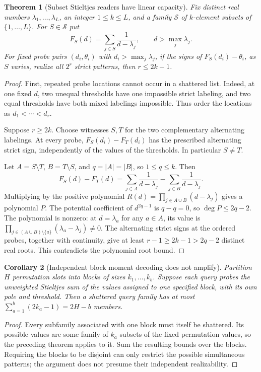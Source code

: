 \documentclass[11pt]{article}
\newtheorem{theorem}{Theorem}
\newtheorem{corollary}[theorem]{Corollary}
\begin{document}
\begin{theorem}[Subset Stieltjes readers have linear capacity]
Fix distinct real numbers $\lambda_1,\ldots,\lambda_L$, an integer
$1\le k\le L$, and a family $\mathcal S$ of $k$-element subsets of
$\{1,\ldots,L\}$. For $S\in\mathcal S$ put
\[
 F_S(d)=\sum_{j\in S}\frac1{d-\lambda_j},
 \qquad d>\max_j\lambda_j.
\]
For fixed probe pairs $(d_i,\theta_i)$ with $d_i>\max_j\lambda_j$,
if the signs of $F_S(d_i)-\theta_i$, as $S$ varies, realize all
$2^r$ strict patterns, then $r\le2k-1$.
\end{theorem}

\begin{proof}
First, repeated probe locations cannot occur in a shattered list.
Indeed, at one fixed $d$, two unequal thresholds have one impossible
strict labeling, and two equal thresholds have both mixed labelings
impossible. Thus order the locations as $d_1<\cdots<d_r$.

Suppose $r\ge2k$. Choose witnesses $S,T$ for the two complementary
alternating labelings. At every probe, $F_S(d_i)-F_T(d_i)$ has the
prescribed alternating strict sign, independently of the values of
the thresholds. In particular $S\ne T$.

Let $A=S\setminus T$, $B=T\setminus S$, and $q=|A|=|B|$, so
$1\le q\le k$. Then
\[
 F_S(d)-F_T(d)=\sum_{j\in A}\frac1{d-\lambda_j}
                 -\sum_{j\in B}\frac1{d-\lambda_j}.
\]
Multiplying by the positive polynomial
$R(d)=\prod_{j\in A\cup B}(d-\lambda_j)$ gives a polynomial $P$.
The potential coefficient of $d^{2q-1}$ is $q-q=0$, so
$\deg P\le2q-2$. The polynomial is nonzero: at $d=\lambda_a$ for
any $a\in A$, its value is
$\prod_{j\in(A\cup B)\setminus\{a\}}(\lambda_a-\lambda_j)\ne0$.
The alternating strict signs at the ordered probes, together with
continuity, give at least $r-1\ge2k-1>2q-2$ distinct real roots.
This contradicts the polynomial root bound.
\end{proof}

\begin{corollary}[Independent block moment decoding does not amplify]
Partition $H$ permutation slots into blocks of sizes $k_1,\ldots,k_b$.
Suppose each query probes the unweighted Stieltjes sum of the values
assigned to one specified block, with its own pole and threshold.
Then a shattered query family has at most
$\sum_{a=1}^b(2k_a-1)=2H-b$ members.
\end{corollary}

\begin{proof}
Every subfamily associated with one block must itself be shattered.
Its possible values are some family of $k_a$-subsets of the fixed
permutation values, so the preceding theorem applies to it. Sum the
resulting bounds over the blocks. Requiring the blocks to be disjoint
can only restrict the possible simultaneous patterns; the argument
does not presume their independent realizability.
\end{proof}
\end{document}
